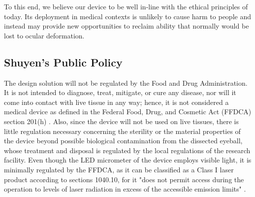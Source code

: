 \documentclass{article}
\begin{document}
To this end, we believe our device to be well in-line with the ethical
principles of today. Its deployment in medical contexts is unlikely
to cause harm to people and instead may provide new opportunities to
reclaim ability that normally would be lost to ocular deformation.
 
 
 
\subsection{Shuyen's Public Policy}
\label{sec:Public Policy}
 
The design solution will not be regulated by the Food and Drug Administration. It is not intended
to diagnose, treat, mitigate, or cure any disease, nor will it come into
contact with live tissue in any way; hence, it is not considered a medical device as defined in the Federal Food, Drug,
and Cosmetic Act (FFDCA) section 201(h) \cite{fdaguidelines}. Also, since the device will not be used
on live tissues, there is little regulation necessary concerning the sterility
or the material properties of the device beyond possible biological contamination from the dissected eyeball, whose treatment and disposal is regulated by
the local regulations of the research facility.  Even though the LED micrometer of the device employs visible light, it is minimally
regulated by the FFDCA, as it can be classified as a Class I
laser product according to sections 1040.10, for it "does not
permit access during the operation to levels of laser radiation in
excess of the accessible emission limits" \cite{fdaguidelines}. 
 
 
 
 
\newpage
{}


 
\end{document}
